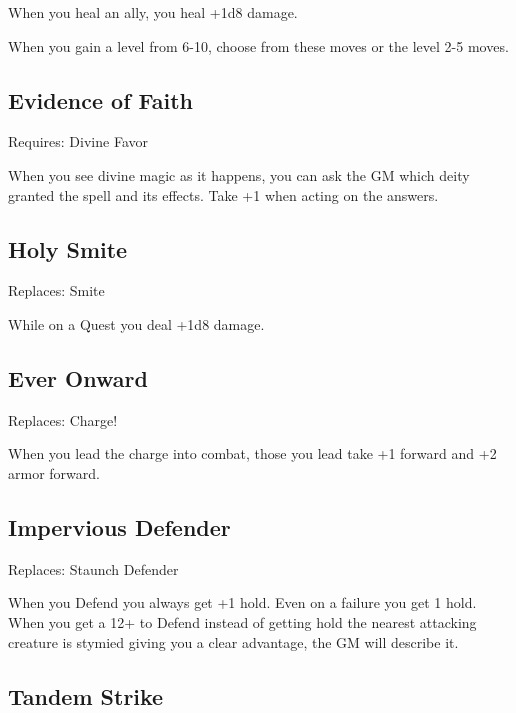 When you heal an ally, you heal +1d8 damage.

         
\startInstructions
When you gain a level from 6-10, choose from these moves or the level 2-5 moves.
\stopInstructions
         
\subsection{Evidence of Faith}    
         

Requires: Divine Favor

         

When you see divine magic as it happens, you can ask the GM which deity granted the spell and its effects. Take +1 when acting on the answers.

         
\subsection{Holy Smite}    
         

Replaces: Smite

         

While on a Quest you deal +1d8 damage.

         
\subsection{Ever Onward}   
         

Replaces: Charge!

         

When you lead the charge into combat, those you lead take +1 forward and +2 armor forward.

         
\subsection{Impervious Defender}    
         

Replaces: Staunch Defender

         

When you Defend you always get +1 hold. Even on a failure you get 1 hold. When you get a 12+ to Defend instead of getting hold the nearest attacking creature is stymied giving you a clear advantage, the GM will describe it.

         
\subsection{Tandem Strike}    
         

